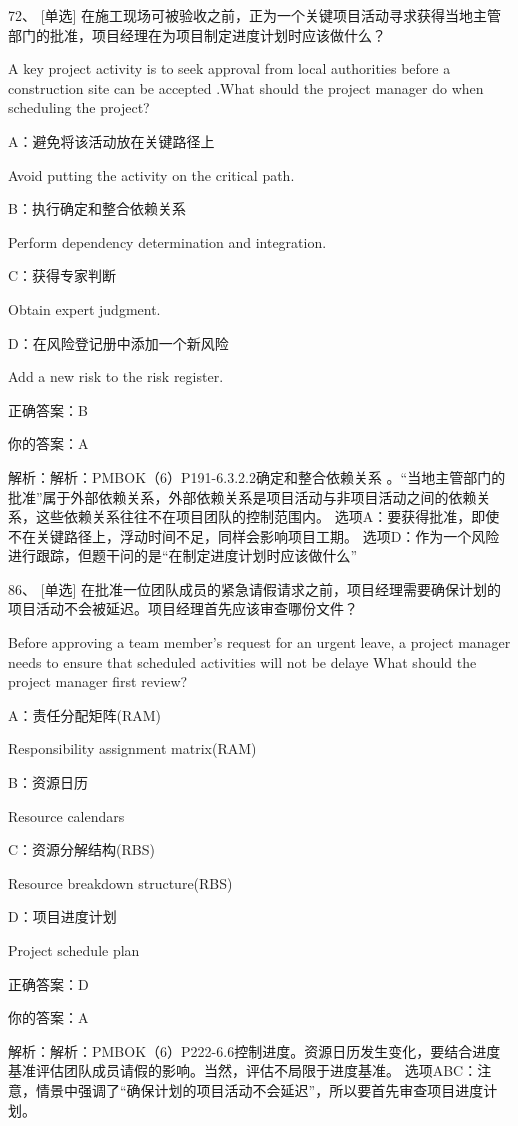 72、 [单选] 在施工现场可被验收之前，正为一个关键项目活动寻求获得当地主管部门的批准，项目经理在为项目制定进度计划时应该做什么？

A key project activity is to seek approval from local authorities before a construction site can be accepted .What should the project manager do when scheduling the project?

A：避免将该活动放在关键路径上

Avoid putting the activity on the critical path.

B：执行确定和整合依赖关系

Perform dependency determination and integration.

C：获得专家判断

Obtain expert judgment.

D：在风险登记册中添加一个新风险

Add a new risk to the risk register.

正确答案：B

你的答案：A

解析：解析：PMBOK（6）P191-6.3.2.2确定和整合依赖关系 。“当地主管部门的批准”属于外部依赖关系，外部依赖关系是项目活动与非项目活动之间的依赖关系，这些依赖关系往往不在项目团队的控制范围内。 选项A：要获得批准，即使不在关键路径上，浮动时间不足，同样会影响项目工期。 选项D：作为一个风险进行跟踪，但题干问的是“在制定进度计划时应该做什么”

86、 [单选] 在批准一位团队成员的紧急请假请求之前，项目经理需要确保计划的项目活动不会被延迟。项目经理首先应该审查哪份文件？

Before approving a team member's request for an urgent leave, a project manager needs to ensure that scheduled activities will not be delaye What should the project manager first review?

A：责任分配矩阵(RAM)

Responsibility assignment matrix(RAM)

B：资源日历

Resource calendars

C：资源分解结构(RBS)

Resource breakdown structure(RBS)

D：项目进度计划

Project schedule plan

正确答案：D

你的答案：A

解析：解析：PMBOK（6）P222-6.6控制进度。资源日历发生变化，要结合进度基准评估团队成员请假的影响。当然，评估不局限于进度基准。 选项ABC：注意，情景中强调了“确保计划的项目活动不会延迟”，所以要首先审查项目进度计划。


